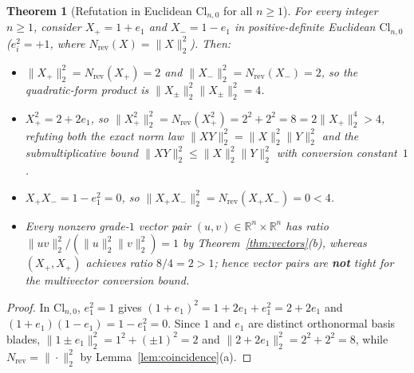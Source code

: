 \documentclass[11pt]{article}
\newtheorem{theorem}{Theorem}[section]
\theoremstyle{definition}
\newcommand{\Cl}{\mathrm{Cl}}
\newcommand{\R}{\mathbb{R}}
\newcommand{\Nrev}{N_{\mathrm{rev}}}
\begin{document}
\begin{theorem}[Refutation in Euclidean $\Cl_{n,0}$ for all $n\ge 1$]\label{thm:ref-euc}
For every integer $n\ge 1$, consider $X_+=1+e_1$ and $X_-=1-e_1$ in positive-definite Euclidean $\Cl_{n,0}$ ($e_i^2=+1$, where $\Nrev(X)=\|X\|_2^2$). Then:
\begin{itemize}
  \item[(a)] $\|X_+\|_2^2=\Nrev(X_+)=2$ and $\|X_-\|_2^2=\Nrev(X_-)=2$, so the quadratic-form product is $\|X_\pm\|_2^2\|X_\pm\|_2^2=4$.
  \item[(b)] $X_+^2=2+2e_1$, so $\|X_+^2\|_2^2=\Nrev(X_+^2)=2^2+2^2=8=2\|X_+\|_2^4>4$, refuting both the exact norm law $\|XY\|_2^2=\|X\|_2^2\|Y\|_2^2$ and the submultiplicative bound $\|XY\|_2^2\le\|X\|_2^2\|Y\|_2^2$ with conversion constant~$1$.
  \item[(c)] $X_+X_-=1-e_1^2=0$, so $\|X_+X_-\|_2^2=\Nrev(X_+X_-)=0<4$.
  \item[(d)] Every nonzero grade-$1$ vector pair $(u,v)\in\R^n\times\R^n$ has ratio $\|uv\|_2^2 / (\|u\|_2^2\|v\|_2^2) = 1$ by Theorem~\ref{thm:vectors}(b), whereas $(X_+,X_+)$ achieves ratio $8/4=2>1$; hence vector pairs are \textbf{not} tight for the multivector conversion bound.
\end{itemize}
\end{theorem}
\begin{proof}
In $\Cl_{n,0}$, $e_1^2=1$ gives $(1+e_1)^2=1+2e_1+e_1^2=2+2e_1$ and $(1+e_1)(1-e_1)=1-e_1^2=0$. Since $1$ and $e_1$ are distinct orthonormal basis blades, $\|1\pm e_1\|_2^2=1^2+(\pm 1)^2=2$ and $\|2+2e_1\|_2^2=2^2+2^2=8$, while $\Nrev=\|\cdot\|_2^2$ by Lemma~\ref{lem:coincidence}(a).
\end{proof}
\end{document}
